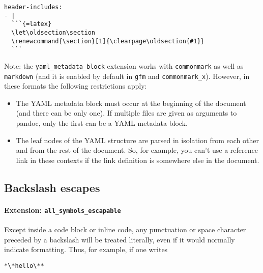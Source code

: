 \documentclass[
  a4paper,
]{article}
\begin{document}
\begin{verbatim}
header-includes:
- |
  ```{=latex}
  \let\oldsection\section
  \renewcommand{\section}[1]{\clearpage\oldsection{#1}}
  ```
\end{verbatim}

Note: the \texttt{yaml\_metadata\_block} extension works with
\texttt{commonmark} as well as \texttt{markdown} (and it is enabled by
default in \texttt{gfm} and \texttt{commonmark\_x}). However, in these
formats the following restrictions apply:

\begin{itemize}
\item
  The YAML metadata block must occur at the beginning of the document
  (and there can be only one). If multiple files are given as arguments
  to pandoc, only the first can be a YAML metadata block.
\item
  The leaf nodes of the YAML structure are parsed in isolation from each
  other and from the rest of the document. So, for example, you can't
  use a reference link in these contexts if the link definition is
  somewhere else in the document.
\end{itemize}

\hypertarget{backslash-escapes}{%
\subsection{Backslash escapes}\label{backslash-escapes}}

\hypertarget{extension-all_symbols_escapable}{%
\paragraph{\texorpdfstring{Extension:
\texttt{all\_symbols\_escapable}}{Extension: all\_symbols\_escapable}}\label{extension-all_symbols_escapable}}

Except inside a code block or inline code, any punctuation or space
character preceded by a backslash will be treated literally, even if it
would normally indicate formatting. Thus, for example, if one writes

\begin{verbatim}
*\*hello\**
\end{verbatim}
\end{document}
